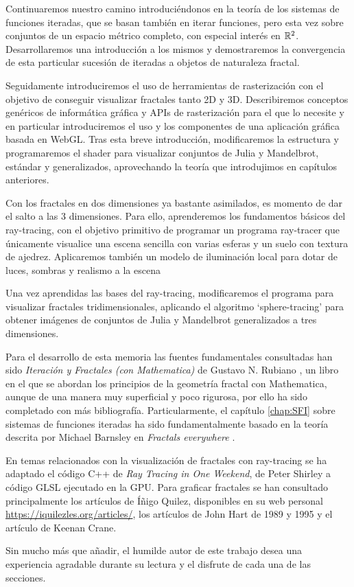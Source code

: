 Continuaremos nuestro camino introduciéndonos en la teoría de los sistemas de funciones iteradas, que se basan también en iterar funciones, pero esta vez sobre conjuntos de un espacio métrico completo, con especial interés en $\mathbb{R}^2$. Desarrollaremos una introducción a los mismos y demostraremos la convergencia de esta particular sucesión de iteradas a objetos de naturaleza fractal.

Seguidamente introduciremos el uso de herramientas de rasterización con el objetivo de conseguir visualizar fractales tanto 2D y 3D. Describiremos conceptos genéricos de informática gráfica y APIs de rasterización para el que lo necesite y en particular introduciremos el uso y los componentes de una aplicación gráfica basada en WebGL. Tras esta breve introducción, modificaremos la estructura y programaremos el shader para visualizar conjuntos de Julia y Mandelbrot, estándar y generalizados, aprovechando la teoría que introdujimos en capítulos anteriores.

Con los fractales en dos dimensiones ya bastante asimilados, es momento de dar el salto a las 3 dimensiones. Para ello, aprenderemos los fundamentos básicos del ray-tracing, con el objetivo primitivo de programar un programa ray-tracer que únicamente visualice una escena sencilla con varias esferas y un suelo con textura de ajedrez. Aplicaremos también un modelo de iluminación local para dotar de luces, sombras y realismo a la escena

Una vez aprendidas las bases del ray-tracing, modificaremos el programa para visualizar fractales tridimensionales, aplicando el algoritmo `sphere-tracing' para obtener imágenes de conjuntos de Julia y Mandelbrot generalizados a tres dimensiones.

Para el desarrollo de esta memoria las fuentes fundamentales consultadas han sido \textit{Iteración y Fractales (con Mathematica)} de Gustavo N. Rubiano \cite{rubiano}, un libro en el que se abordan los principios de la geometría fractal con Mathematica, aunque de una manera muy superficial y poco rigurosa, por ello ha sido completado con más bibliografía. Particularmente, el capítulo \ref{chap:SFI} sobre sistemas de funciones iteradas ha sido fundamentalmente basado en la teoría descrita por Michael Barnsley en \textit{Fractals everywhere} \cite{Barnsley}. 

En temas relacionados con la visualización de fractales con ray-tracing se ha adaptado el código C++ de \textit{Ray Tracing in One Weekend}, de Peter Shirley \cite{Shirley} a código GLSL ejecutado en la GPU. Para graficar fractales se han consultado principalmente los artículos de Íñigo Quilez, disponibles en su web personal \url{https://iquilezles.org/articles/}, los artículos de John Hart de 1989 \cite{Hart-1989} y 1995 \cite{Hart-1995} y el artículo \cite{keenan-crane} de Keenan Crane. 

Sin mucho más que añadir, el humilde autor de este trabajo desea una experiencia agradable durante su lectura y el disfrute de cada una de las secciones.






